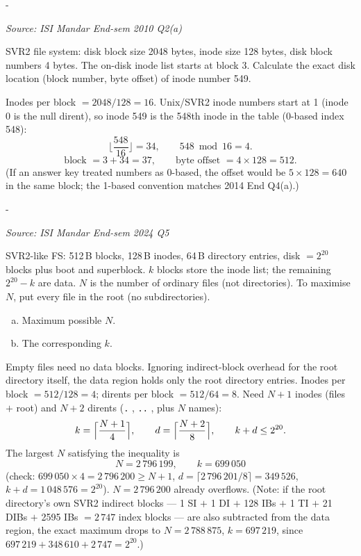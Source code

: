 \documentclass[11pt,a4paper]{article}
\makeatletter
\newcommand{\keepspace}[1]{\par\penalty-100\begingroup
  \setlength{\dimen@}{#1}\dimen@ii\pagegoal\advance\dimen@ii-\pagetotal
  \ifdim\dimen@>\dimen@ii\ifdim\dimen@ii>\z@\vfil\fi\break\fi\endgroup}
\newcounter{qn}[section]
\newenvironment{Qn}[4]{%
  \refstepcounter{qn}\keepspace{7\baselineskip}%
  \begin{tcolorbox}[qboxstyle, title={Q\thesection.\theqn\ \ [#1 \textbar\ #2]\ \ #4}]%
  {\footnotesize\color{g3}\textit{Source: #3}}\par\smallskip%
}{%
  \end{tcolorbox}%
}
\newenvironment{Sol}{%
  \begin{tcolorbox}[sboxstyle, title={Solution}]%
}{%
  \end{tcolorbox}\vspace{0.35em}%
}
\makeatother
\begin{document}
\begin{Qn}{Hard}{Lect 24}{ISI Mandar End-sem 2010 Q2(a)}{Inode-number to disk-block offset}
SVR2 file system: disk block size 2048 bytes, inode size 128 bytes, disk
block numbers 4 bytes. The on-disk inode list starts at block 3.
Calculate the exact disk location (block number, byte offset) of inode
number 549.
\end{Qn}
\begin{Sol}
Inodes per block $= 2048/128 = 16$. Unix/SVR2 inode numbers start at 1
(inode 0 is the null dirent), so inode 549 is the 548th inode in the
table (0-based index 548):
\[
  \biggl\lfloor\frac{548}{16}\biggr\rfloor = 34,\qquad
  548 \bmod 16 = 4.
\]
\[
  \text{block } = 3+34 = 37,\qquad
  \text{byte offset } = 4\times 128 = 512.
\]
(If an answer key treated numbers as 0-based, the offset would be
$5\times 128=640$ in the same block; the 1-based convention matches
2014 End Q4(a).)
\end{Sol}

\begin{Qn}{Hard}{Lect 24}{ISI Mandar End-sem 2024 Q5}{Max ordinary files, all in the root}
SVR2-like FS: 512\,B blocks, 128\,B inodes, 64\,B directory entries,
disk $=2^{20}$ blocks plus boot and superblock. $k$ blocks store the
inode list; the remaining $2^{20}-k$ are data. $N$ is the number of
ordinary files (not directories). To maximise $N$, put every file in
the root (no subdirectories).
\begin{enumerate}[(a)]
\item Maximum possible $N$.
\item The corresponding $k$.
\end{enumerate}
\end{Qn}
\begin{Sol}
Empty files need no data blocks. Ignoring indirect-block overhead for the
root directory itself, the data region holds only the root directory
entries. Inodes per block $=512/128=4$; dirents per block
$=512/64=8$. Need $N+1$ inodes (files $+$ root) and $N+2$ dirents
(\texttt{.} , \texttt{..} , plus $N$ names):
\[
  k = \Bigl\lceil\frac{N+1}{4}\Bigr\rceil,\qquad
  d = \Bigl\lceil\frac{N+2}{8}\Bigr\rceil,\qquad
  k+d \le 2^{20}.
\]
The largest $N$ satisfying the inequality is
\[
  N = 2\,796\,199,\qquad k = 699\,050
\]
(check: $699\,050\times 4 = 2\,796\,200 \ge N+1$,
$d=\lceil 2\,796\,201/8\rceil=349\,526$,
$k+d=1\,048\,576=2^{20}$). $N=2\,796\,200$ already overflows.
(Note: if the root directory's own SVR2 indirect blocks --- 1 SI $+$ 1
DI $+$ 128 IBs $+$ 1 TI $+$ 21 DIBs $+$ 2595 IBs $= 2\,747$ index blocks
--- are also subtracted from the data region, the exact maximum drops to
$N = 2\,788\,875$, $k = 697\,219$, since $697\,219 + 348\,610 + 2\,747 = 2^{20}$.)
\end{Sol}
\end{document}
